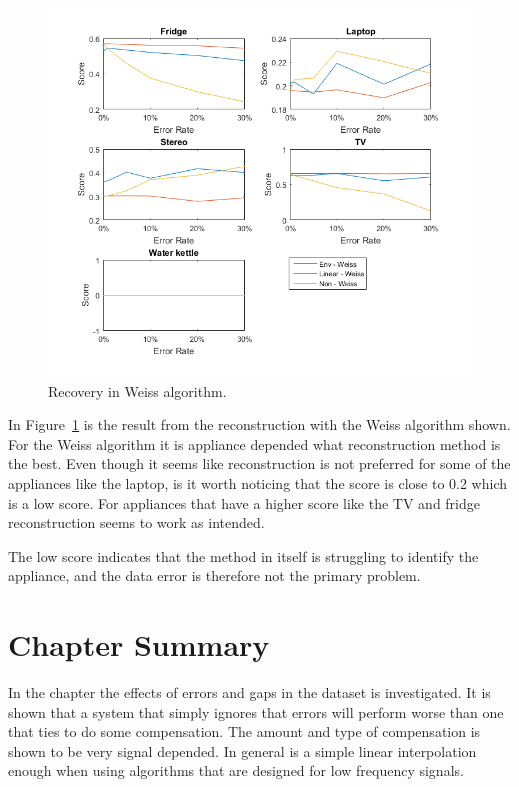 \newpage
\begin{figure}[H]
\centering
\includegraphics[width=1\textwidth]{billeder/Rec-Weiss.png}
\caption{Recovery in Weiss algorithm.}
\label{fig:ERWEISS}
\end{figure}

In Figure~\ref{fig:ERWEISS} is the result from the reconstruction with the Weiss algorithm shown. For the Weiss algorithm it is appliance depended what reconstruction method is the best. Even though it seems like reconstruction is not preferred for some of the appliances like the laptop, is it worth noticing that the score is close to 0.2 which is a low score. For appliances that have a higher score like the TV and fridge reconstruction seems to work as intended.

The low score indicates that the method in itself is struggling to identify the appliance, and the data error is therefore not the primary problem.  


\newpage
\section{Chapter Summary}
In the chapter the effects of errors and gaps in the dataset is investigated. It is shown that a system that simply ignores that errors will perform worse than one that ties to do some compensation. The amount and type of compensation is shown to be very signal depended. In general is a simple linear interpolation enough when using algorithms that are designed for low frequency signals. 


